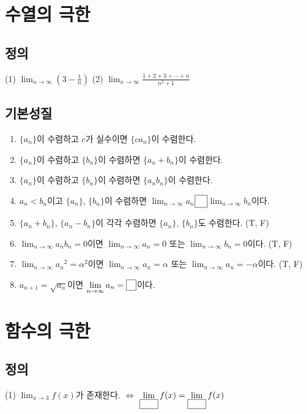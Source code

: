 \documentclass{oblivoir}
\newcommand\pb[1]{\ensuremath{\fbox{\phantom{#1}}}}
\newcounter{num}
\begin{document}
\section{수열의 극한}
\subsection{정의}
(1) \(\displaystyle\lim_{n\to\infty}\left(3-\frac1n\right)\)
(2) \(\displaystyle\lim_{n\to\infty}\frac{1+2+3+\cdots+n}{n^2+1}\)

\subsection{기본성질}
\begin{enumerate}[(1)]
\item
\(\{a_n\}\)이 수렴하고 \(c\)가 실수이면 \(\{ca_n\}\)이 수렴한다.
\item
\(\{a_n\}\)이 수렴하고 \(\{b_n\}\)이 수렴하면 \(\{a_n+b_n\}\)이 수렴한다.
\item
\(\{a_n\}\)이 수렴하고 \(\{b_n\}\)이 수렴하면 \(\{a_nb_n\}\)이 수렴한다.
\item
\(a_n<b_n\)이고 \(\{a_n\}\), \(\{b_n\}\)이 수렴하면 \(\displaystyle\lim_{n\to\infty}a_n\)\:\:\pb{\(\le\)}\:\:\(\displaystyle\lim_{n\to\infty}b_n\)이다.
\item
\(\{a_n+b_n\}\), \(\{a_n-b_n\}\)이 각각 수렴하면 \(\{a_n\}\), \(\{b_n\}\)도 수렴한다. (T, F)
\item
\(\displaystyle\lim_{n\to\infty}a_nb_n=0\)이면 \(\displaystyle\lim_{n\to\infty}a_n=0\) 또는 \(\displaystyle\lim_{n\to\infty}b_n=0\)이다. (T, F)
\item
\(\displaystyle\lim_{n\to\infty}{a_n}^2=\alpha^2\)이면 \(\displaystyle\lim_{n\to\infty}a_n=\alpha\) 또는 \(\displaystyle\lim_{n\to\infty}a_n=-\alpha\)이다. (T, F)
\item
\(a_{n+1}=\sqrt{a_n}\)이면 \(\displaystyle\lim_{n\to\infty}a_n=\pb0\)이다.
\end{enumerate}

\section{함수의 극한}
\subsection{정의}
(1) \(\displaystyle\lim_{x\to3}f(x)\)가 존재한다. \(\iff\) \(\displaystyle\lim_{\pb{aaa}}f(x)=\displaystyle\lim_{\pb{aaa}}f(x)\)
\end{document}
